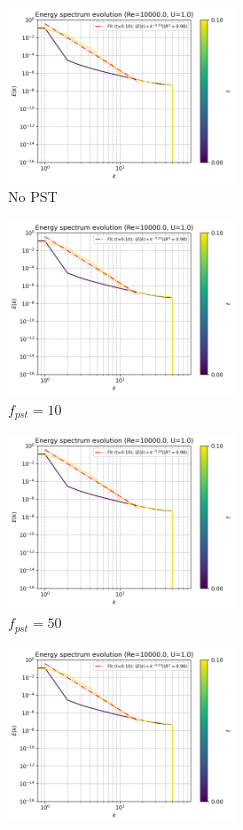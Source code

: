 \begin{figure}[htbp!]
  \begin{subfigure}{7cm}
    \centering\includegraphics[width=6cm]{Code-Figures/okra2022/pst/c0_20_tait_pec_dtmul_1_nx_100_pst_-1_re_10000_ok2022/energy_spectrum_evolution.png}
    \caption{No PST}
  \end{subfigure}
  \begin{subfigure}{7cm}
    \centering\includegraphics[width=6cm]{Code-Figures/okra2022/pst/c0_20_tait_pec_dtmul_1_nx_100_pst_10_re_10000_ok2022/energy_spectrum_evolution.png}
    \caption{$f_{pst} = 10$}
  \end{subfigure}
  \begin{subfigure}{7cm}
    \centering\includegraphics[width=6cm]{Code-Figures/okra2022/pst/c0_20_tait_pec_dtmul_1_nx_100_pst_50_re_10000_ok2022/energy_spectrum_evolution.png}
    \caption{$f_{pst} = 50$}
  \end{subfigure}
  \begin{subfigure}{7cm}
    \centering\includegraphics[width=6cm]{Code-Figures/okra2022/pst/c0_20_tait_pec_dtmul_1_nx_100_pst_100_re_10000_ok2022/energy_spectrum_evolution.png}

\end{subfigure}
\end{figure}

